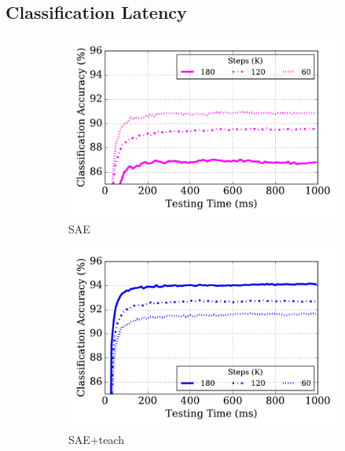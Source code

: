 \subsection{Classification Latency}
\begin{figure}
	\centering
	\begin{subfigure}[t]{0.4\textwidth}
		\includegraphics[width=\textwidth]{pics_sdlm/40_MNIST_SAE_original/latency.pdf}
		\caption{SAE}
	\end{subfigure}
	\begin{subfigure}[t]{0.4\textwidth}
		\includegraphics[width=\textwidth]{pics_sdlm/41_MNIST_SAE_teach/latency.pdf}
		\caption{SAE+teach}
	\end{subfigure}\\
	\begin{subfigure}[t]{0.4\textwidth}

\end{subfigure}
\end{figure}
